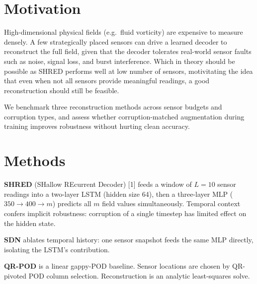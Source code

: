 \documentclass[
     title     = {{Robust Field Reconstruction from Sparse Sensors: SHRED vs SDN vs QR-POD under Sensor Corruption}}
    ,author    = {{Kasper van der Horst and Dimitris Papantzikos}}
    ,subject   = {{Data-Driven Methods for Computational Science and Engineering --- Spring 2026}}
    ,bgcolor   = dtucoolgrey
    ,highlight = dtured
    ,toplogo   = {{tex_dtu_logo_white}}
    ,botlogo   = {{tex_dtu_compute_b_uk}}
    ,papersize = {{a0paper}}
    ,colcount  = {{3columns}}
    ,longtitle
    ,largecaption
]{dtuposter}
\makeatletter
\renewenvironment{dtuposterhead}{%
  \flushleft {\usekomafont{title} \dtuposter@title } \par \vspace*{0.75\baselineskip}%
}{%
  \vspace*{0.75\baselineskip} \par%
}
\makeatother
\begin{document}
\begin{dtuposterhead}
\end{dtuposterhead}

\begin{dtupostercontent}


\section{Motivation}

High-dimensional physical fields (e.g.\ fluid vorticity) are expensive
to measure densely. A few strategically placed sensors can drive a
learned decoder to reconstruct the full field, given that the decoder
tolerates real-world sensor faults such as noise, signal loss, and
burst interference. Which in theory should be possible as SHRED performs well
at low number of sensors, motivitating the idea that even when not all sensors
provide meaningful readings, a good reconstruction should still be feasible.

We benchmark three reconstruction methods across sensor budgets and
corruption types, and assess whether corruption-matched augmentation
during training improves robustness without hurting clean accuracy.

\section{Methods}

\textbf{SHRED} (SHallow REcurrent Decoder) [1] feeds a window of
$L{=}10$ sensor readings into a two-layer LSTM (hidden size 64),
then a three-layer MLP ($350{\to}400{\to}m$) predicts all $m$ field
values simultaneously. Temporal context confers implicit robustness:
corruption of a single timestep has limited effect on the hidden state.

\textbf{SDN} ablates temporal history: one sensor snapshot feeds the
same MLP directly, isolating the LSTM's contribution.

\textbf{QR-POD} is a linear gappy-POD baseline. Sensor locations are
chosen by QR-pivoted POD column selection. Reconstruction is an
analytic least-squares solve.


\end{dtupostercontent}
\end{document}
